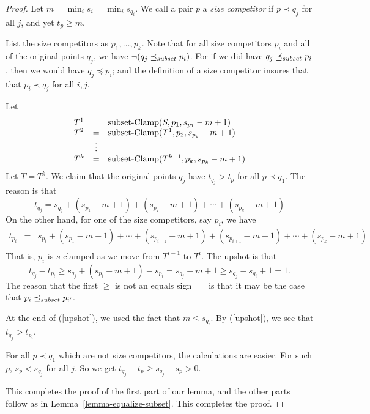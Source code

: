 \documentclass[12pt]{article}
\theoremstyle{definition}
\newcommand{\nott}{\neg}
\begin{document}
 \begin{proof}
 Let $m =  \min_i s_{i} = \min_i s_{q_i}$.
We call a pair $p$ a \emph{size competitor} if 
$p\prec q_j$ for all $j$, and yet  $t_p \geq m$.
 
List the size competitors as $p_1, \ldots, p_k$. 
 Note that for all size competitors $p_i$ and all of the original points
 $q_j$,  we have $\nott (q_j \precsubseteq p_i)$.
For if we did have $q_j \preceq_{\scriptsize subset} p_i$, then we would have 
$q_j \preceq p_i$; and the definition of a size competitor
insures that that $p_i \prec q_j$ for all $i, j$.


 Let \[ \begin{array}{lcl}
 T^1  & = &  \mbox{subset-Clamp}(S,p_1,  s_{p_1} -m + 1)\\

T^2 & = & \mbox{subset-Clamp}(T^1,p_2,  s_{p_2}-m + 1 )\\
  & \vdots   & \\
T^{k} & = & \mbox{subset-Clamp}(T^{k-1},p_k, s_{p_k}-m + 1 )\\
\end{array}
\]
Let $T = T^{k}$.
We claim that the original points $q_j$ have $t_{q_j} > t_{p}$
for all $p \prec q_1$.
The reason is that 
\[ t_{q_j} = s_{q_j} + ( s_{p_1} -m + 1) + (s_{p_2}-m + 1) + \cdots 
+ ( s_{p_k} -m + 1)
\]
On the other hand, for one of the size competitors, say $p_i$, we have
\begin{equation}
\label{nearendsubset}
\begin{array}{lcl}
t_{p_i} & = & s_{p_i} + ( s_{p_1}-m  + 1) + \cdots +
(s_{p_{i-1}} -m  + 1)
+ (s_{p_{i+1}} -m  + 1) + \cdots +(s_{p_k}-m + 1)\\
\end{array}
\end{equation}
That is, $p_i$ is $s$-clamped as we move from $T^{i-1}$ to $T^i$.
The upshot is that 
\begin{equation}\label{upshot}
t_{q_j} - t_{p_i} \geq s_{q_j} + (s_{p_i}-m + 1)  -
s_{p_i} = s_{q_j} - m + 1
\geq  s_{q_j} -s_{q_i} +1  = 1.
\end{equation}
The reason that the first $\geq$ is not an equals sign $=$
is that it may be the case that $p_i\preceq_{\scriptsize subset} p_{i'}$.

At the end of (\ref{upshot}), we used the fact that $m \leq s_{q_i}$.
By (\ref{upshot}), we see that $t_{q_j} > t_{p_i}$.


For all $p \prec q_1$ which are not  size competitors,
the calculations are easier.  For such $p$,
$s_p < s_{q_j}$ for all $j$.
So we get 
$t_{q_j} - t_{p} \geq s_{q_j} - s_{p} > 0$.


This completes the proof of the first part of our lemma, and the other parts follow as in Lemma~\ref{lemma-equalize-subset}.
This completes the proof.
\end{proof}
\end{document}

